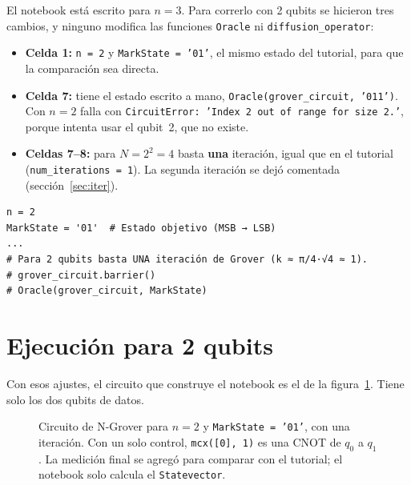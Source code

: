 \documentclass[11pt,a4paper]{article}
\begin{document}
El notebook está escrito para $n=3$. Para correrlo con 2 qubits se hicieron tres cambios, y ninguno
modifica las funciones \texttt{Oracle} ni \texttt{diffusion\_operator}:

\begin{itemize}
\item \textbf{Celda 1:} \texttt{n = 2} y \texttt{MarkState = '01'}, el mismo estado del tutorial, para que la comparación sea directa.
\item \textbf{Celda 7:} tiene el estado escrito a mano, \texttt{Oracle(grover\_circuit, '011')}. Con
$n=2$ falla con \texttt{CircuitError: 'Index 2 out of range for size 2.'}, porque intenta usar el qubit~2, que no existe.
\item \textbf{Celdas 7--8:} para $N=2^2=4$ basta \textbf{una} iteración, igual que en el tutorial
(\texttt{num\_iterations = 1}). La segunda iteración se dejó comentada (sección~\ref{sec:iter}).
\end{itemize}

\begin{lstlisting}
n = 2
MarkState = '01'  # Estado objetivo (MSB → LSB)
...
# Para 2 qubits basta UNA iteración de Grover (k ≈ π/4·√4 ≈ 1).
# grover_circuit.barrier()
# Oracle(grover_circuit, MarkState)
\end{lstlisting}

\section{Ejecución para 2 qubits}

Con esos ajustes, el circuito que construye el notebook es el de la figura~\ref{fig:ngrover}.
Tiene solo los dos qubits de datos.

\begin{figure}[H]
\centering
{}
\caption{Circuito de N-Grover para $n=2$ y \texttt{MarkState = '01'}, con una iteración. Con un solo
control, \texttt{mcx([0], 1)} es una CNOT de $q_0$ a $q_1$. La medición final se agregó para comparar con el
tutorial; el notebook solo calcula el \texttt{Statevector}.}
\label{fig:ngrover}
\end{figure}
\end{document}
